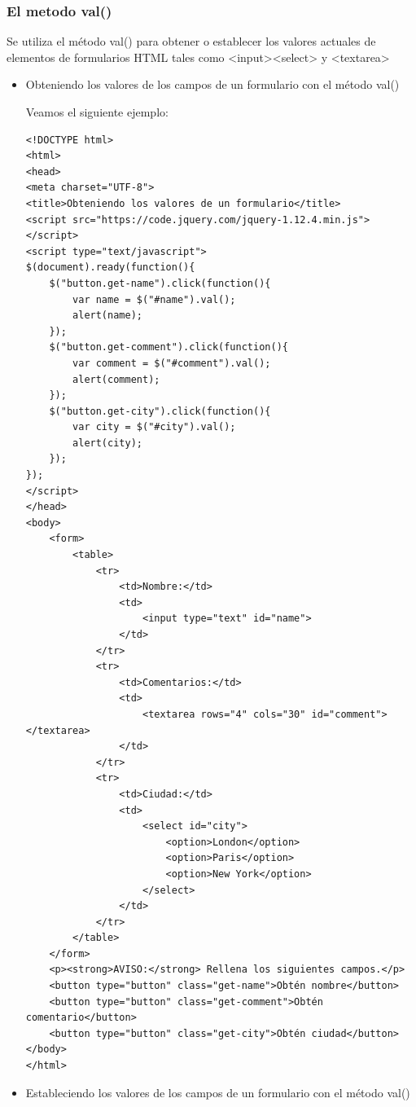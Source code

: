 \documentclass[11pt]{article}
\begin{document}
\subsubsection*{El metodo val()}
\label{sec:orge4e0ac5}

Se utiliza el método val() para obtener o establecer los valores actuales de elementos de formularios HTML tales como <input><select> y <textarea>

\begin{itemize}
\item Obteniendo los valores de los campos de un formulario con el método val()
\label{sec:org93f77db}

Veamos el siguiente ejemplo:

\begin{verbatim}
<!DOCTYPE html>
<html>
<head>
<meta charset="UTF-8">
<title>Obteniendo los valores de un formulario</title>
<script src="https://code.jquery.com/jquery-1.12.4.min.js"></script>
<script type="text/javascript">
$(document).ready(function(){
    $("button.get-name").click(function(){
        var name = $("#name").val();
        alert(name);
    });
    $("button.get-comment").click(function(){
        var comment = $("#comment").val();
        alert(comment);
    });
    $("button.get-city").click(function(){
        var city = $("#city").val();
        alert(city);
    });
});
</script>
</head>
<body>
    <form>
        <table>
            <tr>
                <td>Nombre:</td>
                <td>
                    <input type="text" id="name">
                </td>
            </tr>
            <tr>
                <td>Comentarios:</td>
                <td>
                    <textarea rows="4" cols="30" id="comment"></textarea>
                </td>
            </tr>
            <tr>
                <td>Ciudad:</td>
                <td>
                    <select id="city">
                        <option>London</option>
                        <option>Paris</option>
                        <option>New York</option>
                    </select>
                </td>
            </tr>
        </table>
    </form>
    <p><strong>AVISO:</strong> Rellena los siguientes campos.</p>
    <button type="button" class="get-name">Obtén nombre</button>
    <button type="button" class="get-comment">Obtén comentario</button>
    <button type="button" class="get-city">Obtén ciudad</button>
</body>
</html>                        
\end{verbatim}

\item Estableciendo los valores de los campos de un formulario con el método val()
\label{sec:org89799b6}


\end{itemize}
\end{document}
